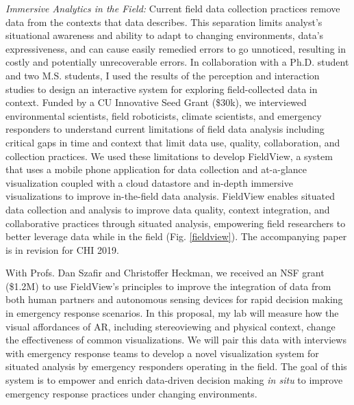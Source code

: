 \documentclass[11pt]{article}
\begin{document}
\emph{Immersive Analytics in the Field:} Current field data collection practices remove data from the contexts that data describes. This separation limits analyst's situational awareness and ability to adapt to changing environments, data's expressiveness, and can cause easily remedied errors to go unnoticed, resulting in costly and potentially unrecoverable errors. In collaboration with a Ph.D. student and two M.S. students, I used the results of the perception and interaction studies to design an interactive system for exploring field-collected data in context. Funded by a CU Innovative Seed Grant (\$30k), we interviewed environmental scientists, field roboticists, climate scientists, and emergency responders to understand current limitations of field data analysis including critical gaps in time and context that limit data use, quality, collaboration, and collection practices. We used these limitations to develop FieldView, a system that uses a mobile phone application for data collection and at-a-glance visualization coupled with a cloud datastore and in-depth immersive visualizations to improve in-the-field data analysis. 
FieldView enables situated data collection and analysis to improve data quality, context integration, and collaborative practices through situated analysis, empowering field researchers to better leverage data while in the field (Fig. \ref{fieldview}). The accompanying paper is in revision for CHI 2019. 

With Profs. Dan Szafir and Christoffer Heckman, we received an NSF grant (\$1.2M) to use FieldView's principles to improve the integration of data from both human partners and autonomous sensing devices for rapid decision making in emergency response scenarios. In this proposal, my lab will measure how the visual affordances of AR, including stereoviewing and physical context, change the effectiveness of common visualizations. We will pair this data with interviews with emergency response teams to develop a novel visualization system for situated analysis by emergency responders operating in the field. The goal of this system is to empower and enrich data-driven decision making \emph{in situ} to improve emergency response practices under changing environments. 
\end{document}
